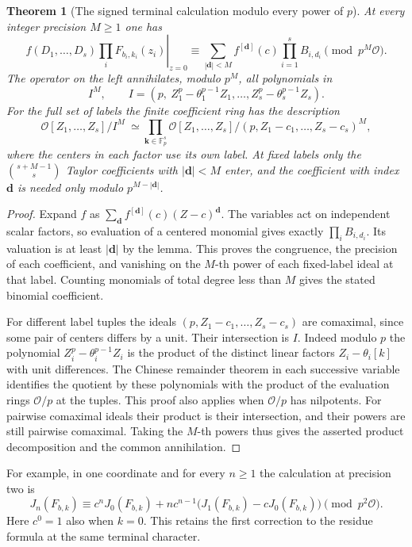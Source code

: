 \documentclass[a4paper,11pt]{article}
\newtheorem{theorem}[proposition]{Theorem}
\theoremstyle{definition}
\theoremstyle{remark}
\numberwithin{equation}{section}
\begin{document}
\begin{theorem}[The signed terminal calculation modulo every power of \(p\)]
\leavevmode\label{thm:connectedjets516}
At every integer precision \(M\ge1\) one has
\[
 \left.f(D_1,\ldots,D_s)\prod_i F_{b_i,k_i}(z_i)\right|_{z=0}
 \equiv
 \sum_{|\mathbf d|<M} f^{[\mathbf d]}(c)
                          \prod_{i=1}^s B_{i,d_i}
                                 \pmod {p^M\mathcal O}.
\]
The operator on the left annihilates, modulo \(p^M\), all polynomials in
\[
   I^M,\qquad I=(p,\ Z_1^p-\theta_1^{p-1}Z_1,\ldots,
                         Z_s^p-\theta_s^{p-1}Z_s).
\]
For the full set of labels the finite coefficient ring has the
description
\[
 \mathcal O[Z_1,\ldots,Z_s]/I^M\ \simeq \prod_{\mathbf k\in\mathbb F_p^s}
       \mathcal O[Z_1,\ldots,Z_s]/(p,Z_1-c_1,\ldots,Z_s-c_s)^M ,
\]
where the centers in each factor use its own label. At fixed
labels only the \(\binom{s+M-1}{s}\) Taylor coefficients with
\(|\mathbf d|<M\) enter, and the coefficient with index \(\mathbf d\)
is needed only modulo \(p^{M-|\mathbf d|}\).
\end{theorem}
\begin{proof}
Expand \(f\) as \(\sum_{\mathbf d}f^{[\mathbf d]}(c)(Z-c)^{\mathbf d}\).
The variables act on independent scalar factors, so evaluation
of a centered monomial gives exactly \(\prod_i B_{i,d_i}\). Its
valuation is at least \(|\mathbf d|\) by the lemma. This proves
the congruence, the precision of each coefficient, and vanishing
on the \(M\)-th power of each fixed-label ideal at that label.
Counting monomials of total degree less than \(M\) gives the
stated binomial coefficient.

For different label tuples the ideals
\((p,Z_1-c_1,\ldots,Z_s-c_s)\) are comaximal, since some pair
of centers differs by a unit. Their intersection is \(I\).
Indeed modulo \(p\) the polynomial
\(Z_i^p-\theta_i^{p-1}Z_i\) is the product of the distinct linear
factors \(Z_i-\theta_i[k]\) with unit differences. The Chinese
remainder theorem in each successive variable identifies the
quotient by these polynomials with the product of the evaluation
rings \(\mathcal O/p\) at the tuples. This proof also applies
when \(\mathcal O/p\) has nilpotents. For pairwise comaximal
ideals their product is their intersection, and their powers
are still pairwise comaximal. Taking the \(M\)-th powers thus
gives the asserted product decomposition and the common annihilation.
\end{proof}

For example, in one coordinate and for every \(n\ge1\) the
calculation at precision two is
\[
 J_n(F_{b,k})\equiv c^n J_0(F_{b,k})
    +n c^{n-1}\bigl(J_1(F_{b,k})-cJ_0(F_{b,k})\bigr)
                              \pmod {p^2\mathcal O}.
\]
Here \(c^0=1\) also when \(k=0\). This retains the first correction
to the residue formula at the same terminal character.
\end{document}
